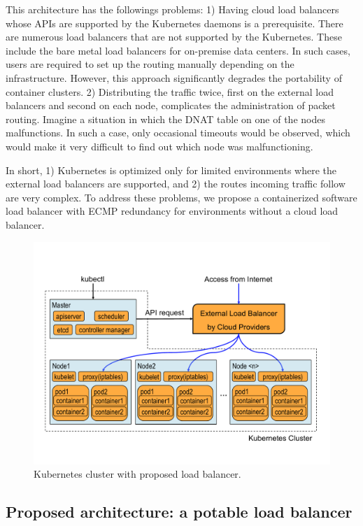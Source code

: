 This architecture has the followings problems: 
1) Having cloud load balancers whose APIs are supported by the Kubernetes daemons is a prerequisite.
There are numerous load balancers that are not supported by the Kubernetes.
These include the bare metal load balancers for on-premise data centers.
In such cases, users are required to set up the routing manually depending on the infrastructure.
However, this approach significantly degrades the portability of container clusters.
2) Distributing the traffic twice, first on the external load balancers and second on each node, 
complicates the administration of packet routing. 
Imagine a situation in which the DNAT table on one of the nodes malfunctions.
In such a case, only occasional timeouts would be observed, which would make it very difficult to find out which node was malfunctioning.   

In short, 1) Kubernetes is optimized only for limited environments where the external load balancers are supported, 
and 2) the routes incoming traffic follow are very complex.
%
To address these problems, we propose a containerized software load balancer with ECMP redundancy for environments without a cloud load balancer.

\begin{figure}[tb]
\includegraphics[width=1.0\columnwidth]{Figs/K8sProposed}
\caption{Kubernetes cluster with proposed load balancer.}
\label{fig:K8sProposed}
\end{figure}

\subsection{Proposed architecture: a potable load balancer}

